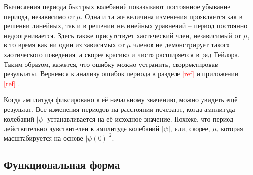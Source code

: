 \documentclass[A4,12pt,oneside]{article}
\renewcommand{\(}{\left(}
\renewcommand{\)}{\right)}
\newcommand{\citeph}{\textcolor{red}{[ref] }}
\begin{document}
Вычисления периода быстрых колебаний показывают постоянное убывание периода, независимо от $\mu$. Одна и та же величина изменения проявляется как в решении линейных, так и в решении нелинейных уравнений -- период постоянно недооценивается. Здесь также присутствует хаотический член, независимый от $\mu$, в то время как ни один из зависимых от $\mu$ членов не демонстрирует такого хаотического поведения, а скорее красиво и чисто расширяется в ряд Тейлора. Таким образом, кажется, что ошибку можно устранить, скорректировав результаты. Вернемся к анализу ошибок периода в разделе \citeph и приложении \citeph .

Когда амплитуда фиксировано к её начальному значению, можно увидеть ещё результат. Все изменения периодов на расстоянии исчезают, когда амплитуда колебаний $\left|\psi\right|$ устанавливается на её исходное значение. Похоже, что период действительно чувствителен к амплитуде колебаний $\left|\psi\right|$, или, скорее, $\mu$, которая масштабируется на основе $\left|\psi\left(0\right)\right|^ 2$.

\subsection{Функциональная форма}
\end{document}
